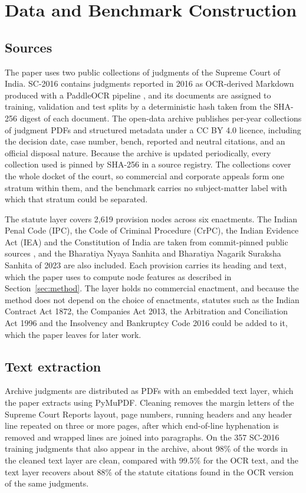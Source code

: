 \documentclass[journal]{IEEEtran}
\begin{document}
\section{Data and Benchmark Construction}\label{sec:data}
\subsection{Sources}
The paper uses two public collections of judgments of the Supreme Court of India. SC-2016 \cite{r29} contains judgments reported in 2016 as OCR-derived Markdown produced with a PaddleOCR pipeline \cite{r61}, and its documents are assigned to training, validation and test splits by a deterministic hash taken from the SHA-256 digest of each document. The open-data archive \cite{r30} publishes per-year collections of judgment PDFs and structured metadata under a CC BY 4.0 licence, including the decision date, case number, bench, reported and neutral citations, and an official disposal nature. Because the archive is updated periodically, every collection used is pinned by SHA-256 in a source registry. The collections cover the whole docket of the court, so commercial and corporate appeals form one stratum within them, and the benchmark carries no subject-matter label with which that stratum could be separated.

The statute layer covers 2,619 provision nodes across six enactments. The Indian Penal Code (IPC), the Code of Criminal Procedure (CrPC), the Indian Evidence Act (IEA) and the Constitution of India are taken from commit-pinned public sources \cite{r62}, and the Bharatiya Nyaya Sanhita and Bharatiya Nagarik Suraksha Sanhita of 2023 are also included. Each provision carries its heading and text, which the paper uses to compute node features as described in Section~\ref{sec:method}. The layer holds no commercial enactment, and because the method does not depend on the choice of enactments, statutes such as the Indian Contract Act 1872, the Companies Act 2013, the Arbitration and Conciliation Act 1996 and the Insolvency and Bankruptcy Code 2016 could be added to it, which the paper leaves for later work.

\subsection{Text extraction}
Archive judgments are distributed as PDFs with an embedded text layer, which the paper extracts using PyMuPDF. Cleaning removes the margin letters of the Supreme Court Reports layout, page numbers, running headers and any header line repeated on three or more pages, after which end-of-line hyphenation is removed and wrapped lines are joined into paragraphs. On the 357 SC-2016 training judgments that also appear in the archive, about 98\% of the words in the cleaned text layer are clean, compared with 99.5\% for the OCR text, and the text layer recovers about 88\% of the statute citations found in the OCR version of the same judgments.
\end{document}

